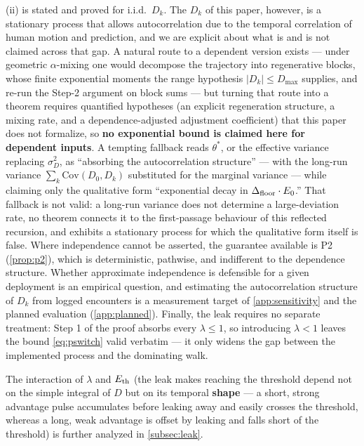 \begin{remark} \label{rem:iid}
(ii) is stated and proved for i.i.d.\ $D_k$. The $D_k$ of this paper, however, is a stationary process that allows autocorrelation due to the temporal correlation of human motion and prediction, and we are explicit about what is and is not claimed across that gap. A natural route to a dependent version exists --- under geometric $\alpha$-mixing one would decompose the trajectory into regenerative blocks, whose finite exponential moments the range hypothesis $|D_k| \le D_{\max}$ supplies, and re-run the Step-2 argument on block sums --- but turning that route into a theorem requires quantified hypotheses (an explicit regeneration structure, a mixing rate, and a dependence-adjusted adjustment coefficient) that this paper does not formalize, so \textbf{no exponential bound is claimed here for dependent inputs}. A tempting fallback reads $\theta^*$, or the effective variance replacing $\sigma_D^2$, as ``absorbing the autocorrelation structure'' --- with the long-run variance $\sum_k \mathrm{Cov}(D_0, D_k)$ substituted for the marginal variance --- while claiming only the qualitative form ``exponential decay in $\Delta_{\text{floor}} \cdot E_0$.'' That fallback is not valid: a long-run variance does not determine a large-deviation rate, no theorem connects it to the first-passage behaviour of this reflected recursion, and  exhibits a stationary process for which the qualitative form itself is false. Where independence cannot be asserted, the guarantee available is P2 (\cref{prop:p2}), which is deterministic, pathwise, and indifferent to the dependence structure. Whether approximate independence is defensible for a given deployment is an empirical question, and estimating the autocorrelation structure of $D_k$ from logged encounters is a measurement target of \cref{app:sensitivity} and the planned evaluation (\cref{app:planned}). Finally, the leak requires no separate treatment: Step 1 of the proof absorbs every $\lambda \le 1$, so introducing $\lambda < 1$ leaves the bound \eqref{eq:pswitch} valid verbatim --- it only widens the gap between the implemented process and the dominating walk.
\end{remark}

\begin{remark}
The interaction of $\lambda$ and $E_{\text{th}}$ (the leak makes reaching the threshold depend not on the simple integral of $D$ but on its temporal \textbf{shape} --- a short, strong advantage pulse accumulates before leaking away and easily crosses the threshold, whereas a long, weak advantage is offset by leaking and falls short of the threshold) is further analyzed in \cref{subsec:leak}.
\end{remark}

